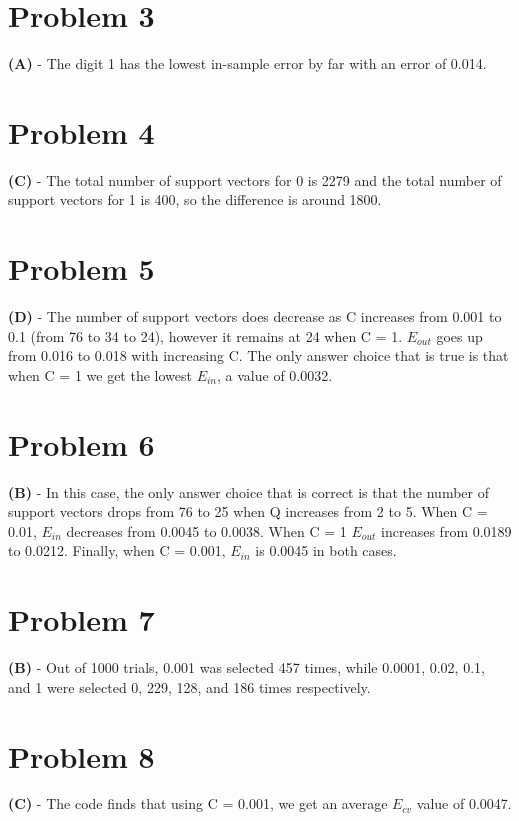 \documentclass[10pt,letter]{article}
\begin{document}
\section*{Problem 3} 

\textbf{(A)} - The digit 1 has the lowest in-sample error by far with an error of 0.014.

\section*{Problem 4}

\textbf{(C)} - The total number of support vectors for 0 is 2279 and the total number of support vectors for 1 is 400, so the difference is around 1800.

\section*{Problem 5}

\textbf{(D)} - The number of support vectors does decrease as C increases from 0.001 to 0.1 (from 76 to 34 to 24), however it remains at 24 when C = 1. $E_{out}$ goes up from 0.016 to 0.018 with increasing C. The only answer choice that is true is that when C = 1 we get the lowest $E_{in}$, a value of 0.0032.

\section*{Problem 6}

\textbf{(B)} - In this case, the only answer choice that is correct is that the number of support vectors drops from 76 to 25 when Q increases from 2 to 5. When C = 0.01, $E_{in}$ decreases from 0.0045 to 0.0038. When C = 1 $E_{out}$ increases from 0.0189 to 0.0212. Finally, when C = 0.001, $E_{in}$ is 0.0045 in both cases.

\section*{Problem 7}

\textbf{(B)} - Out of 1000 trials, 0.001 was selected 457 times, while 0.0001, 0.02, 0.1, and 1 were selected 0, 229, 128, and 186 times respectively.

\section*{Problem 8}

\textbf{(C)} - The code finds that using C = 0.001, we get an average $E_{cv}$ value of 0.0047.
\end{document}
